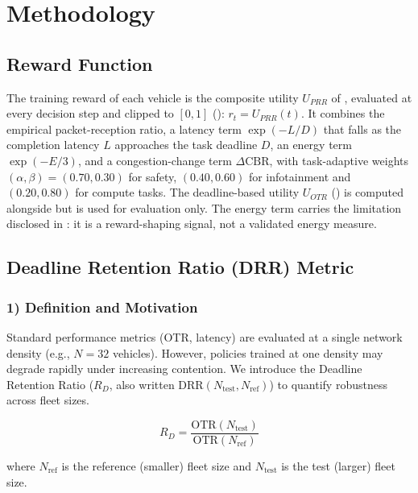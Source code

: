 

\section{Methodology}
\subsection{Reward Function}

The training reward of each vehicle is the composite utility $U_{PRR}$ of , evaluated at every decision step and clipped to $[0,1]$ (): $r_t = U_{PRR}(t)$. It combines the empirical packet-reception ratio, a latency term $\exp(-L/D)$ that falls as the completion latency $L$ approaches the task deadline $D$, an energy term $\exp(-E/3)$, and a congestion-change term $\Delta\text{CBR}$, with task-adaptive weights $(\alpha,\beta) = (0.70, 0.30)$ for safety, $(0.40, 0.60)$ for infotainment and $(0.20, 0.80)$ for compute tasks. The deadline-based utility $U_{OTR}$ () is computed alongside but is used for evaluation only. The energy term carries the limitation disclosed in : it is a reward-shaping signal, not a validated energy measure.

\subsection{Deadline Retention Ratio (DRR) Metric}

\subsubsection*{1) Definition and Motivation}

Standard performance metrics (OTR, latency) are evaluated at a single network density (e.g., $N = 32$ vehicles). However, policies trained at one density may degrade rapidly under increasing contention. We introduce the Deadline Retention Ratio ($R_D$, also written $\text{DRR}(N_{\text{test}}, N_{\text{ref}})$) to quantify robustness across fleet sizes.

\begin{equation}
\label{eq:drr_definition}
R_D = \frac{\text{OTR}(N_{\text{test}})}{\text{OTR}(N_{\text{ref}})}
\end{equation}

where $N_{\text{ref}}$ is the reference (smaller) fleet size and $N_{\text{test}}$ is the test (larger) fleet size.

